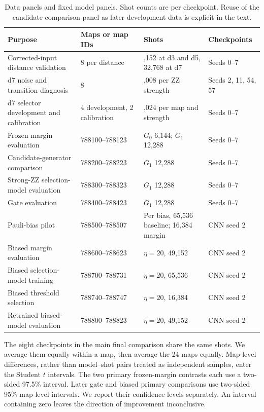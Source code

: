\documentclass[aps,prd,12pt,twocolumn,superscriptaddress,floatfix]{revtex4-2}
\begin{document}
\begin{table}[tb]
\centering
\caption{Data panels and fixed model panels. Shot counts are per checkpoint. Reuse of the candidate-comparison panel as later development data is explicit in the text.}
\label{tab:map-panels}
\small
\begin{tabularx}{\textwidth}{@{}>{\raggedright\arraybackslash}X l >{\raggedright\arraybackslash}X l@{}}
\toprule
Purpose & Maps or map IDs & Shots & Checkpoints \\
\midrule
Corrected-input distance validation & 8 per distance & 49,152 at d3 and d5, 32,768 at d7 & Seeds 0--7 \\
d7 noise and transition diagnosis & 8 & 43,008 per ZZ strength & Seeds 2, 11, 54, 57 \\
d7 selector development and calibration & 4 development, 2 calibration & 1,024 per map and strength & Seeds 0--7 \\
Frozen margin evaluation & 788100--788123 & \(G_0\) 6,144; \(G_1\) 12,288 & Seeds 0--7 \\
Candidate-generator comparison & 788200--788223 & \(G_1\) 12,288 & Seeds 0--7 \\
Strong-ZZ selection-model evaluation & 788300--788323 & \(G_1\) 12,288 & Seeds 0--7 \\
Gate evaluation & 788400--788423 & \(G_1\) 12,288 & Seeds 0--7 \\
Pauli-bias pilot & 788500--788507 & Per bias, 65,536 baseline; 16,384 margin & CNN seed 2 \\
Biased margin evaluation & 788600--788623 & \(\eta=20\), 49,152 & CNN seed 2 \\
Biased selection-model training & 788700--788731 & \(\eta=20\), 65,536 & CNN seed 2 \\
Biased threshold selection & 788740--788747 & \(\eta=20\), 16,384 & CNN seed 2 \\
Retrained biased-model evaluation & 788800--788823 & \(\eta=20\), 49,152 & CNN seed 2 \\
\bottomrule
\end{tabularx}
\end{table}

The eight checkpoints in the main final comparison share the same shots. We average them equally within a map, then average the 24 maps equally. Map-level differences, rather than model--shot pairs treated as independent samples, enter the Student \(t\) intervals. The two primary frozen-margin contrasts each use a two-sided 97.5\% interval. Later gate and biased primary comparisons use two-sided 95\% map-level intervals. We report their confidence levels separately. An interval containing zero leaves the direction of improvement inconclusive.
\end{document}
